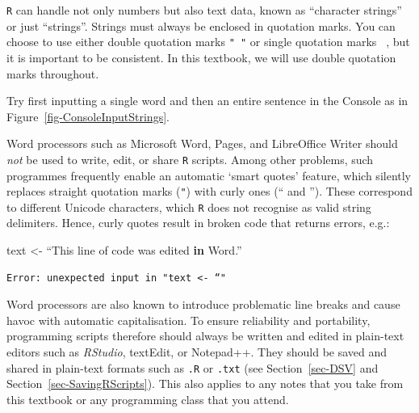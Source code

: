 \documentclass[
  letterpaper,
  DIV=11,
  numbers=noendperiod]{scrreprt}
\newenvironment{Shaded}{\begin{snugshade}}{\end{snugshade}}
\newcommand{\ControlFlowTok}[1]{\textcolor[rgb]{0.00,0.23,0.31}{\textbf{#1}}}
\newcommand{\NormalTok}[1]{\textcolor[rgb]{0.00,0.23,0.31}{#1}}
\newcommand{\OtherTok}[1]{\textcolor[rgb]{0.00,0.23,0.31}{#1}}
\begin{document}
\texttt{R} can handle not only numbers but also text data, known as
``character strings'' or just ``strings''. Strings must always be
enclosed in quotation marks. You can choose to use either double
quotation marks \texttt{"\ "} or single quotation marks
\texttt{\textquotesingle{}\ \textquotesingle{}}, but it is important to
be consistent. In this textbook, we will use double quotation marks
throughout.

Try first inputting a single word and then an entire sentence in the
Console as in Figure~\ref{fig-ConsoleInputStrings}.

\begin{tcolorbox}[enhanced jigsaw, arc=.35mm, bottomrule=.15mm, bottomtitle=1mm, breakable, colback=white, colbacktitle=quarto-callout-warning-color!10!white, colframe=quarto-callout-warning-color-frame, coltitle=black, left=2mm, leftrule=.75mm, opacityback=0, opacitybacktitle=0.6, rightrule=.15mm, title=\textcolor{quarto-callout-warning-color}{\faExclamationTriangle}\hspace{0.5em}{Warning}, titlerule=0mm, toprule=.15mm, toptitle=1mm]

Word processors such as Microsoft Word, Pages, and LibreOffice Writer
should \emph{not} be used to write, edit, or share \texttt{R} scripts.
Among other problems, such programmes frequently enable an automatic
`smart quotes' feature, which silently replaces straight quotation marks
(\texttt{"}) with curly ones (`` and ''). These correspond to different
Unicode characters, which \texttt{R} does not recognise as valid string
delimiters. Hence, curly quotes result in broken code that returns
errors, e.g.:

\begin{Shaded}
\begin{Highlighting}[]
\NormalTok{text }\OtherTok{\textless{}{-}}\NormalTok{ “This line of code was edited }\ControlFlowTok{in}\NormalTok{ Word.”}
\end{Highlighting}
\end{Shaded}

\begin{verbatim}
Error: unexpected input in "text <- “"
\end{verbatim}

Word processors are also known to introduce problematic line breaks and
cause havoc with automatic capitalisation. To ensure reliability and
portability, programming scripts therefore should always be written and
edited in plain-text editors such as \emph{RStudio}, textEdit, or
Notepad++. They should be saved and shared in plain-text formats such as
\texttt{.R} or \texttt{.txt} (see Section~\ref{sec-DSV} and
Section~\ref{sec-SavingRScripts}). This also applies to any notes that
you take from this textbook or any programming class that you attend.

\end{tcolorbox}
\end{document}
